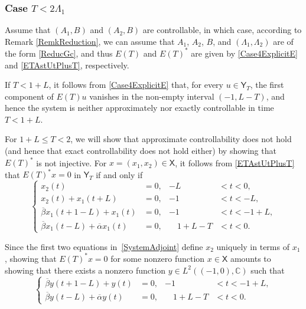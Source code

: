 \documentclass[10pt]{article}
\theoremstyle{plain}
\theoremstyle{definition}
\numberwithin{equation}{section}\numberwithin{figure}{section}\emergencystretch=3em
\begin{document}
\subsubsection{\texorpdfstring{Case $T < 2 \Lambda_1$}{Case T < 2 Lambda1}}

Assume that $(A_1, B)$ and $(A_2, B)$ are controllable, in which case, according to Remark \ref{RemkReduction}, we can assume that $A_1$, $A_2$, $B$, and $(\Lambda_1, \Lambda_2)$ are of the form \eqref{ReducGc}, and thus $E(T)$ and $E(T)^\ast$ are given by \eqref{Case4ExplicitE} and \eqref{ETAstUtPlusT}, respectively.

If $T < 1 + L$, it follows from \eqref{Case4ExplicitE} that, for every $u \in \mathsf Y_T$, the first component of $E(T) u$ vanishes in the non-empty interval $(-1, L - T)$, and hence the system is neither approximately nor exactly controllable in time $T < 1 + L$.

For $1 + L \leq T < 2$, we will show that approximate controllability does not hold (and hence that exact controllability does not hold either) by showing that $E(T)^\ast$ is not injective. For $x = (x_1, x_2) \in \mathsf X$, it follows from \eqref{ETAstUtPlusT} that $E(T)^\ast x = 0$ in $\mathsf Y_T$ if and only if
\begin{equation}
\label{SystemAdjoint}
\left\{
\begin{aligned}
x_2(t) & = 0, & -L & < t < 0, \\
x_2(t) + x_1(t + L) & = 0, & -1 & < t < -L, \\
\overline\beta x_1(t + 1 - L) + x_1(t) & = 0, & -1 & < t < -1 + L, \\
\overline\beta x_1(t - L) + \overline\alpha x_1(t) & = 0, & \quad 1 + L - T & < t < 0.
\end{aligned}
\right.
\end{equation}

Since the first two equations in~\eqref{SystemAdjoint} define $x_2$ uniquely in terms of $x_1$, showing that $E(T)^\ast x = 0$ for some nonzero function $x \in \mathsf X$ amounts to showing that there exists a nonzero function $y \in L^2((-1, 0), \mathbb C)$ such that
\begin{equation}
\label{EquationV}
\left\{
\begin{aligned}
\overline\beta y(t + 1 - L) + y(t) & = 0, & -1 & < t < -1 + L, \\
\overline\beta y(t - L) + \overline\alpha y(t) & = 0, & \quad 1 + L - T & < t < 0.
\end{aligned}
\right.
\end{equation}
\end{document}
